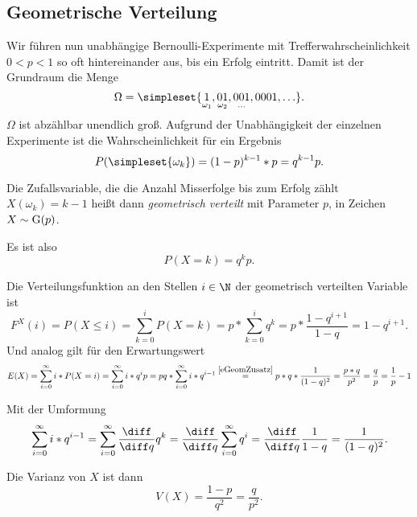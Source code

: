 \subsection{Geometrische Verteilung}
Wir führen nun unabhängige Bernoulli-Experimente mit Trefferwahrscheinlichkeit $0<p<1$ so oft hintereinander aus, bis ein Erfolg eintritt. Damit ist der Grundraum die Menge
\begin{equation*}
	\Omega =\simpleset{\underset{\omega_1}{1},\underset{\omega_2}{01},\underset{\ldots}{001},0001,\ldots}.
\end{equation*}
$\Omega$ ist abzählbar unendlich groß. Aufgrund der Unabhängigkeit der einzelnen Experimente ist die Wahrscheinlichkeit für ein Ergebnis
\begin{equation*}
	P(\simpleset{\omega_k})=(1-p)^{k-1}*p=q^{k-1}p.
\end{equation*}

Die Zufallsvariable, die die Anzahl Misserfolge bis zum Erfolg zählt $X(\omega_k)=k-1$ heißt dann \emph{geometrisch verteilt} mit Parameter $p$, in Zeichen $X\sim \operatorname{G}(p)$.

Es ist also
\begin{equation*}
	P(X=k)=q^kp.
\end{equation*}

Die Verteilungsfunktion an den Stellen $i\in \N$ der geometrisch verteilten Variable ist
\begin{equation*}
	F^X(i)=P(X\leq i) = \sum_{k=0}^i P(X=k)=p*\sum_{k=0}^i q^k=p*\frac{1-q^{i+1}}{1-q}=1-q^{i+1}.
\end{equation*}
Und analog gilt für den Erwartungswert
\begin{equation*}
 	E(X)=\sum_{i=0}^\infty i*P(X=i)=\sum_{i=0}^\infty i*q^ip=pq*\sum_{i=0}^\infty i*q^{i-1}\overset{\ref{eGeomZusatz}}=p*q*\frac1{(1-q)^2}=\frac{p*q}{p^2}=\frac qp=\frac1p-1
\end{equation*} 

Mit der Umformung
\begin{equation}
	\sum_{i=0}^\infty i*q^{i-1}=\sum_{i=0}^\infty \frac{\diff}{\diff q} q^k=\frac{\diff}{\diff q} \sum_{i=0}^\infty q^i = \frac{\diff}{\diff q}\frac{1}{1-q}=\frac{1}{(1-q)^2}.\label{eGeomZusatz}
\end{equation}

Die Varianz von $X$ ist dann
\begin{equation*}
	V(X)=\frac{1-p}{q^2}=\frac{q}{p^2}.
\end{equation*}


